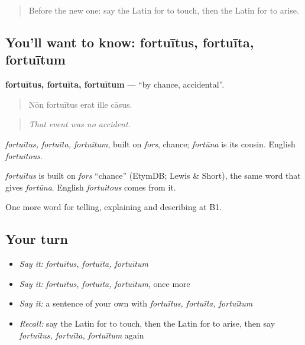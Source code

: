 \label{lesson:LA-C375-fortuitus}



\begin{quote}
Before the new one: say the Latin for to touch, then the Latin for to arise.
\end{quote}

\subsection*{You'll want to know: fortuītus, fortuīta, fortuītum}
\textbf{fortuītus, fortuīta, fortuītum} — \textquotedblleft{}by chance, accidental\textquotedblright{}.

\begin{quote}
Nōn fortuītus erat ille cāsus.
\end{quote}

\begin{quote}
\emph{That event was no accident.}
\end{quote}

\emph{fortuītus, fortuīta, fortuītum}, built on \emph{fors}, chance; \emph{fortūna} is its cousin. English \emph{fortuitous}.

\begin{cousinweb}
\emph{fortuītus} is built on \emph{fors} \textquotedblleft{}chance\textquotedblright{} (EtymDB; Lewis \& Short), the same word that gives \emph{fortūna}. English \emph{fortuitous} comes from it.
\end{cousinweb}

\begin{grammarlens}[title={What you've built}]
One more word for telling, explaining and describing at B1.
\end{grammarlens}

\subsection*{Your turn}
\begin{itemize}
\raggedright
  \item \emph{Say it:} \emph{fortuītus, fortuīta, fortuītum}
  \item \emph{Say it:} \emph{fortuītus, fortuīta, fortuītum}, once more
  \item \emph{Say it:} a sentence of your own with \emph{fortuītus, fortuīta, fortuītum}
  \item \emph{Recall:} say the Latin for to touch, then the Latin for to arise, then say \emph{fortuītus, fortuīta, fortuītum} again
\end{itemize}

